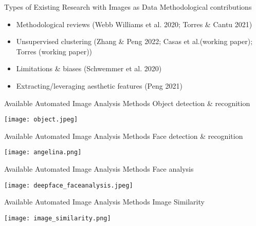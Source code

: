   \begin{frame}{Types of Existing Research with Images as Data}
  \large{Methodological contributions}
  
  \begin{itemize}
  \setlength\itemsep{0.2cm}
      \item Methodological reviews (Webb Williams et al. 2020; Torres \& Cantu 2021)
      
      \item Unsupervised clustering (Zhang \& Peng 2022; Casas et al.(working paper); Torres (working paper))
      
      \item Limitations \& biases (Schwemmer et al. 2020)
      
      \item Extracting/leveraging aesthetic features (Peng 2021)
      
      
  \end{itemize}
  
  \end{frame}
  
  \begin{frame}{Available Automated Image Analysis Methods}
  \large{Object detection \& recognition}
  
  \texttt{[image: object.jpeg]} \centering
  
  \end{frame}
  
  
  \begin{frame}{Available Automated Image Analysis Methods}
  \large{Face detection \& recognition}
  
  \texttt{[image: angelina.png]} \centering
  
  \end{frame}
  
  \begin{frame}{Available Automated Image Analysis Methods}
  \large{Face analysis}
  
  \texttt{[image: deepface\_faceanalysis.jpeg]} \centering
  
  \end{frame}
  
  \begin{frame}{Available Automated Image Analysis Methods}
  \large{Image Similarity}
  
  \texttt{[image: image\_similarity.png]} \centering
  
  \end{frame}
  
